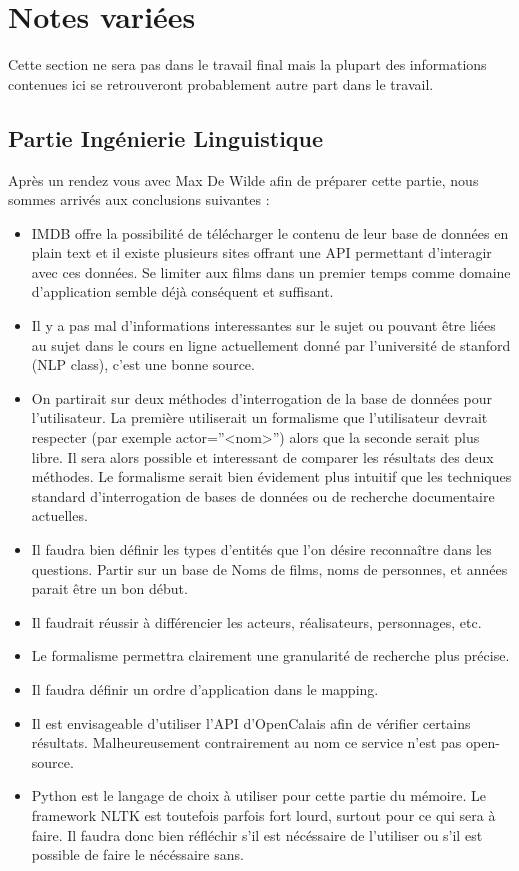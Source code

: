 \documentclass[12pt]{article}
\begin{document}
\section{Notes variées}
Cette section ne sera pas dans le travail final mais la plupart des informations contenues ici se retrouveront probablement autre part dans le travail.
\subsection{Partie Ingénierie Linguistique}
Après un rendez vous avec Max De Wilde afin de préparer cette partie, nous sommes arrivés aux conclusions suivantes :
\begin{itemize}
  \item IMDB offre la possibilité de télécharger le contenu de leur base de données en plain text et il existe plusieurs sites offrant une API permettant d'interagir avec ces données. Se limiter aux films dans un premier temps comme domaine d'application semble déjà conséquent et suffisant.
  \item Il y a pas mal d'informations interessantes sur le sujet ou pouvant être liées au sujet dans le cours en ligne actuellement donné par l'université de stanford (NLP class), c'est une bonne source.
  \item On partirait sur deux méthodes d'interrogation de la base de données pour l'utilisateur. La première utiliserait un formalisme que l'utilisateur devrait respecter (par exemple actor=''<nom>'') alors que la seconde serait plus libre. Il sera alors possible et interessant de comparer les résultats des deux méthodes. Le formalisme serait bien évidement plus intuitif que les techniques standard d'interrogation de bases de données ou de recherche documentaire actuelles.
  \item Il faudra bien définir les types d'entités que l'on désire reconnaître dans les questions. Partir sur un base de Noms de films, noms de personnes, et années parait être un bon début.
  \item Il faudrait réussir à différencier les acteurs, réalisateurs, personnages, etc.
  \item Le formalisme permettra clairement une granularité de recherche plus précise.
  \item Il faudra définir un ordre d'application dans le mapping.
  \item Il est envisageable d'utiliser l'API d'OpenCalais afin de vérifier certains résultats. Malheureusement contrairement au nom ce service n'est pas open-source.
  \item Python est le langage de choix à utiliser pour cette partie du mémoire. Le framework NLTK est toutefois parfois fort lourd, surtout pour ce qui sera à faire. Il faudra donc bien réfléchir s'il est nécéssaire de l'utiliser ou s'il est possible de faire le nécéssaire sans.
\end{itemize}
\end{document}
